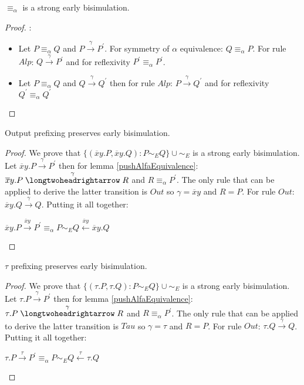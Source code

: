 \begin{proposition}
  $\equiv_{\alpha}$ is a strong early bisimulation.
  \begin{proof}:
    \begin{itemize}
      \item
	Let $P\equiv_{\alpha} Q$ and $P\xrightarrow{\gamma}P^{'}$. For symmetry of $\alpha$ equivalence: $Q\equiv_{\alpha}P$. For rule $Alp$: $Q\xrightarrow{\gamma}P^{'}$ and for reflexivity $P^{'}\equiv_{\alpha}P^{'}$.
      \item
	Let $P\equiv_{\alpha} Q$ and $Q\xrightarrow{\gamma}Q^{'}$ then for rule $Alp$: $P\xrightarrow{\gamma}Q^{'}$ and for reflexivity $Q^{'}\equiv_{\alpha}Q^{'}$
    \end{itemize}
  \end{proof}
\end{proposition}


\begin{lemma}\label{outputPreservesEarlyBisimulation}
  Output prefixing preserves early bisimulation. 
  \begin{proof}
    We prove that $\{(\overline{x}y.P, \overline{x}y.Q): P\sim_{E}Q\}\cup \sim_{E}$ is a strong early bisimulation. Let $\overline{x}y.P\xrightarrow{\gamma}P^{'}$ then for lemma \ref{pushAlfaEquivalence}: $\overline{x}y.P\stackrel{\gamma}{\longtwoheadrightarrow} R$ and $R\equiv_{\alpha}P^{'}$. The only rule that can be applied to derive the latter transition is $Out$ so $\gamma = \overline{x}y$ and $R=P$. For rule $Out$: $\overline{x}y.Q\xrightarrow{\gamma} Q$. Putting it all together: 
    \begin{center}
      $\overline{x}y.P\xrightarrow{\overline{x}y}P^{'} \equiv_{\alpha} P \sim_{E} Q \stackrel{\overline{x}y}{\longleftarrow} \overline{x}y.Q$
    \end{center}
  \end{proof}
\end{lemma}


\begin{lemma}\label{tauPreservesEarlyBisimulation}
  $\tau$ prefixing preserves early bisimulation. 
  \begin{proof}
    We prove that $\{(\tau.P, \tau.Q): P\sim_{E}Q\}\cup \sim_{E}$ is a strong early bisimulation. Let $\tau.P\xrightarrow{\gamma}P^{'}$ then for lemma \ref{pushAlfaEquivalence}: $\tau.P\stackrel{\gamma}{\longtwoheadrightarrow} R$ and $R\equiv_{\alpha}P^{'}$. The only rule that can be applied to derive the latter transition is $Tau$ so $\gamma = \tau$ and $R=P$. For rule $Out$: $\tau.Q\xrightarrow{\gamma} Q$. Putting it all together: 
    \begin{center}
      $\tau.P\xrightarrow{\tau}P^{'} \equiv_{\alpha} P \sim_{E} Q \stackrel{\tau}{\longleftarrow} \tau.Q$
    \end{center}
  \end{proof}
\end{lemma}


